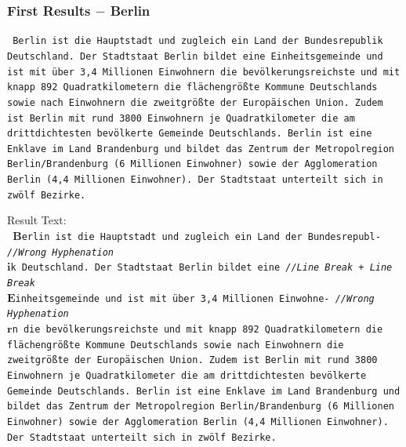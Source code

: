 \documentclass{beamer}
\begin{document}
\begin{frame}
\frametitle{First Results $-$ Berlin}

\texttt{\tiny
Berlin ist die Hauptstadt und zugleich ein Land der Bundesrepublik \\
Deutschland. Der Stadtstaat Berlin bildet eine Einheitsgemeinde und \\
ist mit über 3,4 Millionen Einwohnern die bevölkerungsreichste und mit \\
knapp 892 Quadratkilometern die flächengrößte Kommune Deutschlands \\
sowie nach Einwohnern die zweitgrößte der Europäischen Union. Zudem \\
ist Berlin mit rund 3800 Einwohnern je Quadratkilometer die am \\
drittdichtesten bevölkerte Gemeinde Deutschlands. Berlin ist eine \\
Enklave im Land Brandenburg und bildet das Zentrum der Metropolregion \\
Berlin/Brandenburg (6 Millionen Einwohner) sowie der Agglomeration \\
Berlin (4,4 Millionen Einwohner). Der Stadtstaat unterteilt sich in \\
zwölf Bezirke. \\
}

Result Text: \\

\texttt{\tiny
$\boldsymbol{B}$erlin ist die Hauptstadt und zugleich ein Land der Bundesrepubl- \hskip 15pt \emph{//Wrong Hyphenation} \\
$\boldsymbol{i}$k Deutschland. Der Stadtstaat Berlin bildet eine \hskip 65pt \emph{//Line Break + Line Break} \\
$\boldsymbol{E}$inheitsgemeinde und ist mit über 3,4 Millionen Einwohne- \hskip 40pt \emph{//Wrong Hyphenation} \\
$\boldsymbol{r}$n die bevölkerungsreichste und mit knapp 892 Quadratkilometern die \\
flächengrößte Kommune Deutschlands sowie nach Einwohnern die \\
zweitgrößte der Europäischen Union. Zudem ist Berlin mit rund 3800 \\
Einwohnern je Quadratkilometer die am drittdichtesten bevölkerte \\
Gemeinde Deutschlands. Berlin ist eine Enklave im Land Brandenburg und \\
bildet das Zentrum der Metropolregion Berlin/Brandenburg (6 Millionen \\
Einwohner) sowie der Agglomeration Berlin (4,4 Millionen Einwohner). \\
Der Stadtstaat unterteilt sich in zwölf Bezirke. \\
}
\end{frame}
\end{document}
